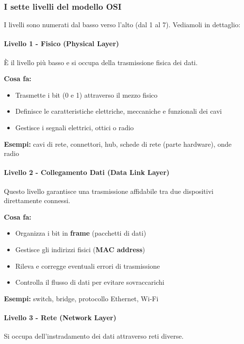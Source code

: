 \documentclass[12pt,a4paper]{article}
\begin{document}
\subsubsection{I sette livelli del modello OSI}

I livelli sono numerati dal basso verso l'alto (dal 1 al 7). Vediamoli in dettaglio:

\paragraph{Livello 1 - Fisico (Physical Layer)}
È il livello più basso e si occupa della trasmissione fisica dei dati.

\textbf{Cosa fa:}
\begin{itemize}
    \item Trasmette i bit (0 e 1) attraverso il mezzo fisico
    \item Definisce le caratteristiche elettriche, meccaniche e funzionali dei cavi
    \item Gestisce i segnali elettrici, ottici o radio
\end{itemize}

\textbf{Esempi:} cavi di rete, connettori, hub, schede di rete (parte hardware), onde radio

\paragraph{Livello 2 - Collegamento Dati (Data Link Layer)}
Questo livello garantisce una trasmissione affidabile tra due dispositivi direttamente connessi.

\textbf{Cosa fa:}
\begin{itemize}
    \item Organizza i bit in \textbf{frame} (pacchetti di dati)
    \item Gestisce gli indirizzi fisici (\textbf{MAC address})
    \item Rileva e corregge eventuali errori di trasmissione
    \item Controlla il flusso di dati per evitare sovraccarichi
\end{itemize}

\textbf{Esempi:} switch, bridge, protocollo Ethernet, Wi-Fi

\paragraph{Livello 3 - Rete (Network Layer)}
Si occupa dell'instradamento dei dati attraverso reti diverse.
\end{document}
